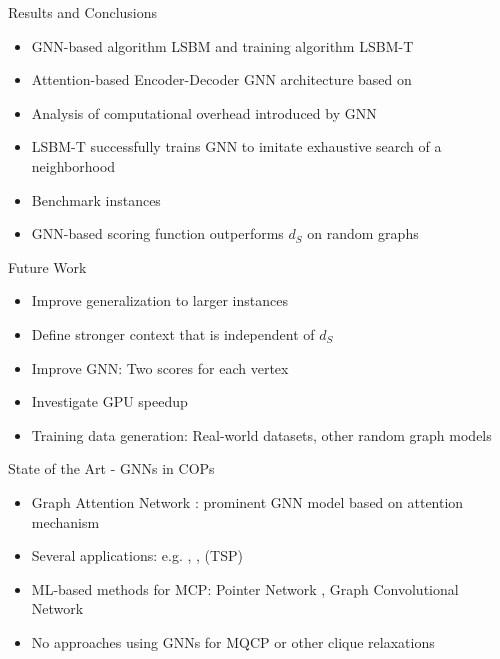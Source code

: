 \documentclass{beamer}
\newcommand{\backupbegin}{
   \newcounter{finalframe}
   \setcounter{finalframe}{\value{framenumber}}
}
\begin{document}
\begin{frame}{Results and Conclusions}
    \begin{itemize}
        \item<1-> GNN-based algorithm LSBM and training algorithm LSBM-T
        \item<2-> Attention-based Encoder-Decoder GNN architecture based on \cite{Kool2019}
        \item<3-> Analysis of computational overhead introduced by GNN
        \item<4-> LSBM-T successfully trains GNN to imitate exhaustive search of a neighborhood
        \item<5-> Benchmark instances
        \item<6-> GNN-based scoring function outperforms $d_S$ on random graphs
    \end{itemize}
\end{frame}

\begin{frame}{Future Work}
    \begin{itemize}
        \item<1-> Improve generalization to larger instances
        \item<2-> Define stronger context that is independent of $d_S$
        \item<3-> Improve GNN: Two scores for each vertex
        \item<4-> Investigate GPU speedup
        \item<5-> Training data generation: Real-world datasets, other random graph models
    \end{itemize}
\end{frame}

\backupbegin

 


\begin{frame}{State of the Art - GNNs in COPs}
    \begin{itemize}
        \item<1-> Graph Attention Network \cite{Velickovic2018}: prominent GNN model based on attention mechanism \cite{Bahdanau2015}
        \item<2-> Several applications: e.g. \cite{Kool2019}, \cite{Joshi2021}, \cite{Hudson2021} (TSP)
        \item<4-> ML-based methods for MCP: Pointer Network \cite{Gu2020}, Graph Convolutional Network \cite{Li2018}
        \item<5-> No approaches using GNNs for MQCP or other clique relaxations
    \end{itemize}
\end{frame}
\end{document}
